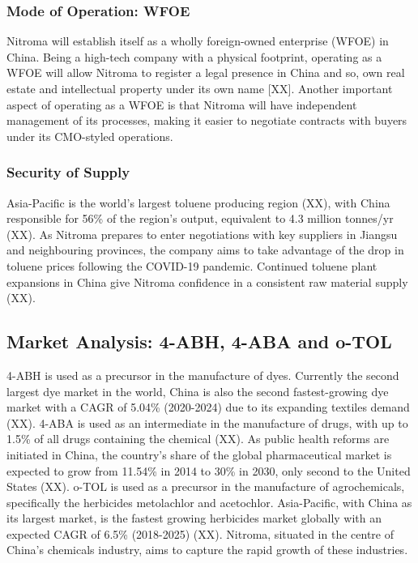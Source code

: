 \subsubsection{Mode of Operation: WFOE}
Nitroma will establish itself as a wholly foreign-owned enterprise (WFOE) in China. Being a high-tech company with a physical footprint, operating as a WFOE will allow Nitroma to register a legal presence in China and so, own real estate and intellectual property under its own name [XX]. Another important aspect of operating as a WFOE is that Nitroma will have independent management of its processes, making it easier to negotiate contracts with buyers under its CMO-styled operations.


\subsubsection{Security of Supply}
Asia-Pacific is the world's largest toluene producing region (XX), with China responsible for 56\% of the region’s output, equivalent to 4.3 million tonnes/yr (XX). As Nitroma prepares to enter negotiations with key suppliers in Jiangsu and neighbouring provinces, the company aims to take advantage of the drop in toluene prices following the COVID-19 pandemic. Continued toluene plant expansions in China give Nitroma confidence in a consistent raw material supply (XX).

\subsection{Market Analysis: 4-ABH, 4-ABA and o-TOL}
4-ABH is used as a precursor in the manufacture of dyes. Currently the second largest dye market in the world, China is also the second fastest-growing dye market with a CAGR of 5.04\% (2020-2024) due to its expanding textiles demand (XX). 4-ABA is used as an intermediate in the manufacture of drugs, with up to 1.5\% of all drugs containing the chemical (XX). As public health reforms are initiated in China, the country’s share of the global pharmaceutical market is expected to grow from 11.54\% in 2014 to 30\% in 2030, only second to the United States (XX). o-TOL is used as a precursor in the manufacture of agrochemicals, specifically the herbicides metolachlor and acetochlor. Asia-Pacific, with China as its largest market, is the fastest growing herbicides market globally with an expected CAGR of 6.5\% (2018-2025) (XX). Nitroma, situated in the centre of China’s chemicals industry, aims to capture the rapid growth of these industries.  

